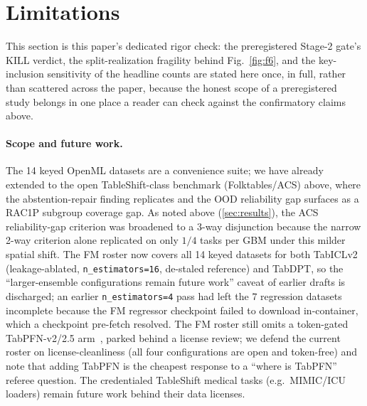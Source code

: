 \documentclass[11pt]{article}
\begin{document}
\section{Limitations}\label{sec:limitations}
This section is this paper's dedicated rigor check: the preregistered Stage-2 gate's KILL verdict, the
split-realization fragility behind Fig.~\ref{fig:f6}, and the key-inclusion sensitivity of the headline
counts are stated here once, in full, rather than scattered across the paper, because the honest scope of a
preregistered study belongs in one place a reader can check against the confirmatory claims above.
\paragraph{Scope and future work.} The 14 keyed OpenML datasets are a convenience suite; we have already
extended to the open TableShift-class benchmark (Folktables/ACS) above, where the abstention-repair finding
replicates and the OOD reliability gap surfaces as a RAC1P subgroup coverage gap. As noted above
(\cref{sec:results}), the ACS reliability-gap criterion was broadened to a 3-way disjunction because the
narrow 2-way criterion alone replicated on only $1/4$ tasks per GBM under this milder spatial shift.
The FM roster now covers all 14 keyed datasets for both TabICLv2 (leakage-ablated, \texttt{n\_estimators=16},
de-staled reference) and TabDPT, so the ``larger-ensemble configurations remain future work'' caveat of earlier
drafts is discharged; an earlier \texttt{n\_estimators=4} pass had left the $7$ regression datasets incomplete
because the FM regressor checkpoint failed to download in-container, which a checkpoint pre-fetch resolved. The
FM roster still omits a token-gated TabPFN-v2/2.5 arm~\citep{hollmann2025tabpfn,tabpfn25_2025}, parked behind
a license review; we defend the current roster on license-cleanliness (all four configurations are open and
token-free) and note that adding TabPFN is the cheapest response to a ``where is TabPFN'' referee question.
The credentialed TableShift medical tasks (e.g.\ MIMIC/ICU loaders) remain future work behind their
data licenses.
\end{document}
